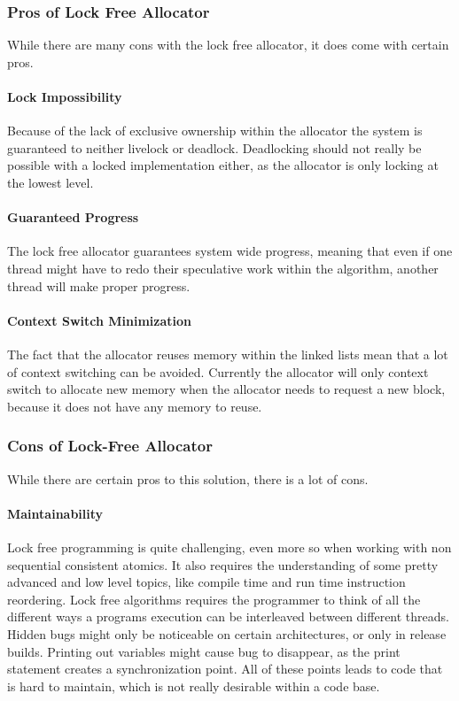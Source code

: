 \subsubsection{Pros of Lock Free Allocator}
While there are many cons with the lock free allocator, it does come with certain pros.

\paragraph{Lock Impossibility}
Because of the lack of exclusive ownership within the allocator the system is guaranteed to neither livelock or deadlock.
Deadlocking should not really be possible with a locked implementation either, as the allocator is only locking at the lowest level.

\paragraph{Guaranteed Progress}
The lock free allocator guarantees system wide progress, meaning that even if one thread might have to redo their speculative work
within the algorithm, another thread will make proper progress.

\paragraph{Context Switch Minimization}
The fact that the allocator reuses memory within the linked lists mean that a lot of context switching can be avoided.
Currently the allocator will only context switch to allocate new memory when the allocator needs to request a new block,
because it does not have any memory to reuse.


\subsubsection{Cons of Lock-Free Allocator}
While there are certain pros to this solution, there is a lot of cons.

\paragraph{Maintainability}
Lock free programming is quite challenging, even more so when working with non sequential consistent atomics.
It also requires the understanding of some pretty advanced and low level topics, like compile time and run time instruction reordering.
Lock free algorithms requires the programmer to think of all the different ways a programs execution can be interleaved between different threads.
Hidden bugs might only be noticeable on certain architectures, or only in release builds.
Printing out variables might cause bug to disappear, as the print statement creates a synchronization point.
All of these points leads to code that is hard to maintain, which is not really desirable within a code base.

